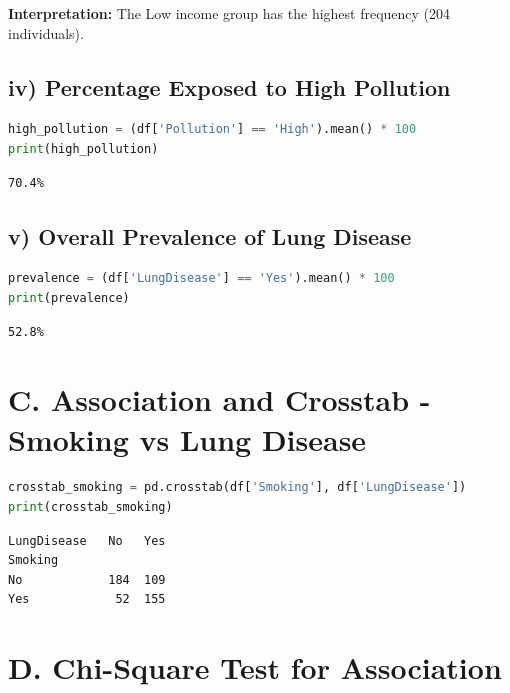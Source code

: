 \documentclass[12pt, a4paper]{article}
\begin{document}
\textbf{\textcolor{RoyalNavy}{Interpretation:}} The Low income group has the highest frequency (204 individuals).

\subsection*{iv) Percentage Exposed to High Pollution}

\begin{lstlisting}[language=Python]
high_pollution = (df['Pollution'] == 'High').mean() * 100
print(high_pollution)
\end{lstlisting}

\begin{outputbox}
\begin{verbatim}
70.4%
\end{verbatim}
\end{outputbox}

\subsection*{v) Overall Prevalence of Lung Disease}

\begin{lstlisting}[language=Python]
prevalence = (df['LungDisease'] == 'Yes').mean() * 100
print(prevalence)
\end{lstlisting}

\begin{outputbox}
\begin{verbatim}
52.8%
\end{verbatim}
\end{outputbox}

\section*{C. Association and Crosstab - Smoking vs Lung Disease}

\begin{lstlisting}[language=Python]
crosstab_smoking = pd.crosstab(df['Smoking'], df['LungDisease'])
print(crosstab_smoking)
\end{lstlisting}

\begin{outputbox}
\begin{verbatim}
LungDisease   No   Yes
Smoking
No            184  109
Yes            52  155
\end{verbatim}
\end{outputbox}

\section*{D. Chi-Square Test for Association}
\end{document}

